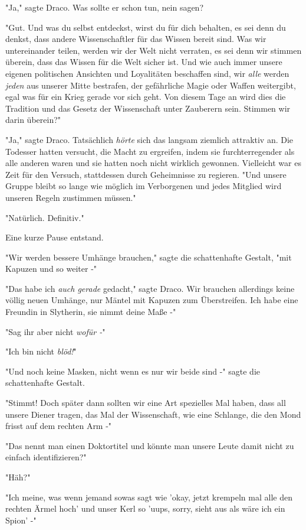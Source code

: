 {"Ja," sagte Draco. Was sollte er schon tun, nein sagen?

"Gut. Und was du selbst entdeckst, wirst du für dich behalten, es sei denn du denkst, dass andere Wissenschaftler für das Wissen bereit sind. Was wir untereinander teilen, werden wir der Welt nicht verraten, es sei denn wir stimmen überein, dass das Wissen für die Welt sicher ist. Und wie auch immer unsere eigenen politischen Ansichten und Loyalitäten beschaffen sind, wir \emph{alle} werden \emph{jeden} aus unserer Mitte bestrafen, der gefährliche Magie oder Waffen weitergibt, egal was für ein Krieg gerade vor sich geht. Von diesem Tage an wird dies die Tradition und das Gesetz der Wissenschaft unter Zauberern sein. Stimmen wir darin überein?"

"Ja," sagte Draco. Tatsächlich \emph{hörte} sich das langsam ziemlich attraktiv an. Die Todesser hatten versucht, die Macht zu ergreifen, indem sie furchterregender als alle anderen waren und sie hatten noch nicht wirklich gewonnen. Vielleicht war es Zeit für den Versuch, stattdessen durch Geheimnisse zu regieren. "Und unsere Gruppe bleibt so lange wie möglich im Verborgenen und jedes Mitglied wird unseren Regeln zustimmen müssen."

"Natürlich. Definitiv."

Eine kurze Pause entstand.

"Wir werden bessere Umhänge brauchen," sagte die schattenhafte Gestalt, "mit Kapuzen und so weiter -"

"Das habe ich \emph{auch gerade} gedacht," sagte Draco. Wir brauchen allerdings keine völlig neuen Umhänge, nur Mäntel mit Kapuzen zum Überstreifen. Ich habe eine Freundin in Slytherin, sie nimmt deine Maße -"

"Sag ihr aber nicht \emph{wofür -}"

"Ich bin nicht \emph{blöd!}"

"Und noch keine Masken, nicht wenn es nur wir beide sind -" sagte die schattenhafte Gestalt.

"Stimmt! Doch später dann sollten wir eine Art spezielles Mal haben, dass all unsere Diener tragen, das Mal der Wissenschaft, wie eine Schlange, die den Mond frisst auf dem rechten Arm -"

"Das nennt man einen Doktortitel und könnte man unsere Leute damit nicht zu einfach identifizieren?"

"Häh?"

"Ich meine, was wenn jemand sowas sagt wie 'okay, jetzt krempeln mal alle den rechten Ärmel hoch' und unser Kerl so 'uups, sorry, sieht aus als wäre ich ein Spion' -"

}
